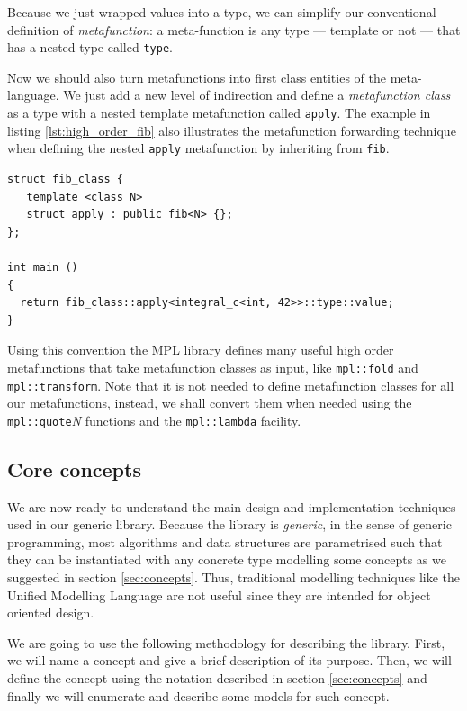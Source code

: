 Because we just wrapped values into a type, we can simplify our
conventional definition of \emph{metafunction}: a meta-function is any
type --- template or not --- that has a nested type called
\texttt{type}.

Now we should also turn metafunctions into first class entities of the
meta-language. We just add a new level of indirection and define a
\emph{metafunction class} as a type with a
nested template metafunction called \texttt{apply}. The example in
listing \ref{lst:high_order_fib} also illustrates the metafunction
forwarding technique when defining the nested \texttt{apply}
metafunction by inheriting from \texttt{fib}.

\begin{lstlisting}[float, caption=Metafunction class for
  computing Fibonacci numbers. We suppose that the previous
  \texttt{fib} definition uses \texttt{integral\_c} to wrap its
  parameters and return types., label=lst:high_order_fib]
struct fib_class { 
   template <class N>
   struct apply : public fib<N> {};
};

int main ()
{
  return fib_class::apply<integral_c<int, 42>>::type::value;
}
\end{lstlisting}

Using this convention the MPL library defines many useful high order
metafunctions that take metafunction
classes as input, like \texttt{mpl::fold} and
\texttt{mpl::transform}. Note that it is not needed to define
metafunction classes for all our metafunctions, instead, we shall
convert them when needed using the \texttt{mpl::quote}\emph{N}
functions and the \texttt{mpl::lambda} facility.

\subsection{Core concepts}
\label{sec:ns-sound-beg}
We are now ready to understand the main design and implementation
techniques used in our generic library. Because the library is
\emph{generic}, in the sense of generic programming, most algorithms
and data structures are parametrised such that they can be
instantiated with any concrete type modelling some concepts as we
suggested in section \ref{sec:concepts}. Thus, traditional modelling
techniques like the Unified Modelling Language are not useful since
they are intended for object oriented design.

We are going to use the following methodology for describing the
library. First, we will name a concept and give a brief description of
its purpose. Then, we will define the concept using the notation
described in section \ref{sec:concepts} and finally we will enumerate
and describe some models for such concept.

